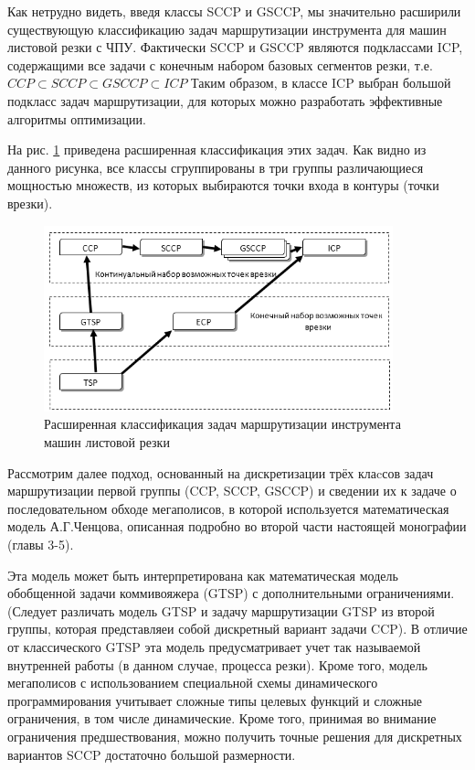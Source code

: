\documentclass{article}
\begin{document}
Как нетрудно видеть,
введя классы SCCP и  GSCCP,
мы значительно расширили существующую
классификацию задач маршрутизации инструмента
для машин листовой резки с ЧПУ.
Фактически SCCP и GSCCP являются подклассами ICP,
содержащими все задачи с конечным набором базовых сегментов резки,
т.е.
$CCP \subset SCCP \subset GSCCP \subset ICP$
Таким образом, в классе ICP выбран большой подкласс
задач маршрутизации,
для которых можно разработать эффективные алгоритмы оптимизации.

На рис. \ref{x-classify}
приведена расширенная классификация этих задач.
Как видно из данного  рисунка,
все классы сгруппированы в три группы
различающиеся мощностью множеств,
из которых выбираются точки входа в контуры
(точки врезки).

\begin{figure}
  \begin{center}
  \includegraphics[width=0.9\textwidth]{x-classify.png}
  \caption{Расширенная классификация задач маршрутизации инструмента машин листовой резки }
  \label{x-classify}
  \end{center}
\end{figure}

Рассмотрим далее подход,
основанный на  дискретизации трёх клаcсов задач маршрутизации
первой группы (CCP, SCCP, GSCCP)
и сведении их к задаче о последовательном обходе мегаполисов,
в которой  используется математическая модель А.Г.Ченцова,
описанная подробно во второй части настоящей монографии
(главы 3-5).

Эта модель может быть интерпретирована
как математическая модель обобщенной задачи коммивояжера (GTSP)
с дополнительными ограничениями.
(Следует различать модель GTSP и задачу маршрутизации GTSP из второй группы,
которая представляеи собой дискретный вариант задачи CCP).
В отличие от классического GTSP эта модель
предусматривает учет так называемой внутренней работы
(в данном случае, процесса резки).
Кроме того, модель мегаполисов с
использованием специальной схемы динамического программирования
учитывает сложные типы целевых функций и сложные ограничения,
в том числе динамические.
Кроме того, принимая во внимание ограничения предшествования,
можно получить точные решения для дискретных вариантов SCCP
достаточно большой размерности.
\end{document}
